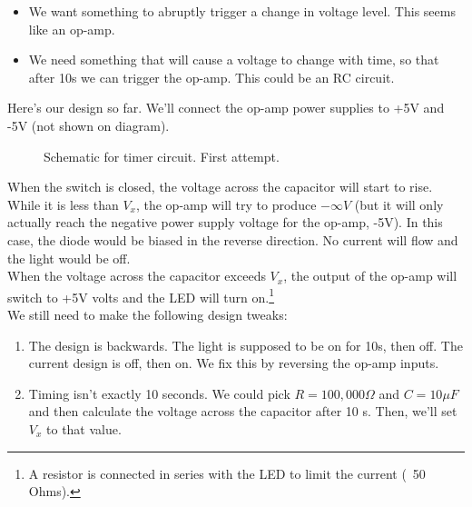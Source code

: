 \begin{itemize}
\item We want something to abruptly trigger a change in voltage level. This seems like an op-amp.
\item We need something that will cause a voltage to change with time, so that after 10s we can trigger the op-amp. This could be an RC circuit.
\end{itemize}

Here's our design so far. We'll connect the op-amp power supplies to +5V and -5V (not shown on diagram).

\begin{figure}[H]
\begin{center}
\caption{Schematic for timer circuit. First attempt.}
\end{center}
\end{figure}

When the switch is closed, the voltage across the capacitor will start to rise. While it is less than $V_x$, the op-amp will try to produce $-\infty V$ (but it will only actually reach the negative power supply voltage for the op-amp, -5V). In this case, the diode would be biased in the reverse direction. No current will flow and the light would be off. \\

When the voltage across the capacitor exceeds $V_x$, the output of the op-amp will switch to +5V volts and the LED will turn on.\footnote{A resistor is connected in series with the LED to limit the current (~50 Ohms).} \\

We still need to make the following design tweaks:
\begin{enumerate}
\item The design is backwards. The light is supposed to be on for 10s, then off. The current design is off, then on. We fix this by reversing the op-amp inputs.
\item Timing isn't exactly 10 seconds. We could pick $R=100,000\Omega$ and $C=10\mu F$ and then calculate the voltage across the capacitor after 10 s. Then, we'll set $V_x$ to that value.
\end{enumerate}

